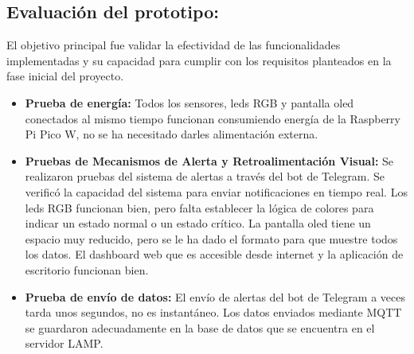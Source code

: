 \subsection{Evaluación del prototipo:}

El objetivo principal fue validar la efectividad de las funcionalidades implementadas y su capacidad para cumplir con los requisitos planteados en la fase inicial del proyecto.
\begin{itemize}
	\item \textbf{Prueba de energía:}
Todos los sensores, leds RGB y pantalla oled conectados al mismo tiempo funcionan consumiendo energía de la Raspberry Pi Pico W, no se ha necesitado darles alimentación externa.
	\item \textbf{Pruebas de Mecanismos de Alerta y Retroalimentación Visual:}
Se realizaron pruebas del sistema de alertas a través del bot de Telegram. Se verificó la capacidad del sistema para enviar notificaciones en tiempo real.
Los leds RGB funcionan bien, pero falta establecer la lógica de colores para indicar un estado normal o un estado crítico.
La pantalla oled tiene un espacio muy reducido, pero se le ha dado el formato para que muestre todos los datos.
El dashboard web que es accesible desde internet y la aplicación de escritorio funcionan bien.

\item \textbf{Prueba de envío de datos:}
El envío de alertas del bot de Telegram a veces tarda unos segundos, no es instantáneo.
Los datos enviados mediante MQTT se guardaron adecuadamente en la base de datos que se encuentra en el servidor LAMP.
\end{itemize}
